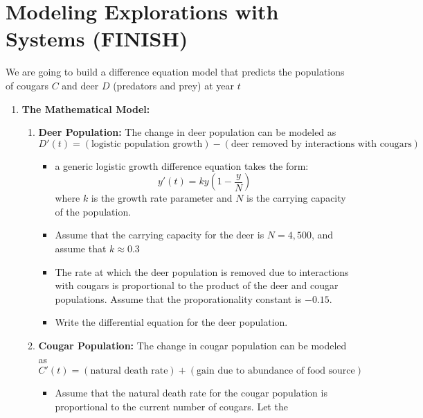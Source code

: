 \section{Modeling Explorations with Systems (FINISH)}
\begin{problem}
We are going to build a difference equation model that predicts the populations of cougars
$C$ and deer $D$ (predators and prey) at year $t$
\begin{enumerate}
    \item {\bf The Mathematical Model:} 
        \begin{enumerate}
            \item {\bf Deer Population:} The change in deer population can be modeled as 
                \[ D'(t) = (\text{logistic population growth}) - (\text{deer removed
                by interactions with cougars}) \]
                \begin{itemize}
                    \item a generic logistic growth difference equation takes the form: 
                        \[ y'(t) = k y \left(1-\frac{y}{N}\right) \]
                        where $k$ is the growth rate parameter and
                        $N$ is the carrying capacity of the population.
                    \item Assume that the carrying capacity for the deer is $N = 4,500$,
                        and assume that $k \approx 0.3$
                    \item The rate at which the deer population is removed due to
                        interactions with cougars is proportional to the product of the
                        deer and cougar populations.  Assume that the proporationality
                        constant is $-0.15$.
                    \item Write the differential equation for the deer population. 
                \end{itemize}
            \item {\bf Cougar Population:} The change in cougar population can be modeled
                as
                \[ C'(t) = \left( \text{natural death rate} \right) + \left(
                    \text{gain due to abundance of food source}
                \right) \]
                \begin{itemize}
                    \item Assume that the natural death rate for the cougar population is
                        proportional to the current number of cougars.  Let the

\end{itemize}
\end{enumerate}
\end{enumerate}
\end{problem}
